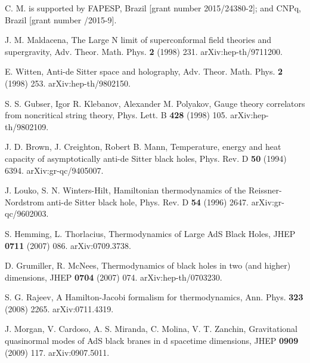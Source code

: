 \documentclass[prd,onecolumn,notitlepage,amsmath,nofootinbib,superscriptaddress,showpacs,showkeys]{revtex4-1}
\begin{document}



\begin{acknowledgments}

C. M. is supported by FAPESP, Brazil [grant number 2015/24380-2]; and CNPq,
Brazil [grant number /2015-9].

\end{acknowledgments}



\bigskip{}



\begin{thebibliography}{99}

J. M. Maldacena, The Large N limit of superconformal
field theories and supergravity, Adv. Theor. Math. Phys. \textbf{2}
(1998) 231. arXiv:hep-th/9711200.

E. Witten, Anti-de Sitter space and holography, Adv.
Theor. Math. Phys. \textbf{2} (1998) 253. arXiv:hep-th/9802150.

S. S. Gubser, Igor R. Klebanov, Alexander M. Polyakov,
Gauge theory correlators from noncritical string theory, Phys. Lett.
B \textbf{428} (1998) 105. arXiv:hep-th/9802109.

J. D. Brown, J. Creighton, Robert B. Mann, Temperature,
energy and heat capacity of asymptotically anti-de Sitter black holes,
Phys. Rev. D \textbf{50} (1994) 6394. arXiv:gr-qc/9405007.

J. Louko, S. N. Winters-Hilt, Hamiltonian thermodynamics
of the Reissner-Nordstrom anti-de Sitter black hole, Phys. Rev. D
\textbf{54} (1996) 2647. arXiv:gr-qc/9602003.

S. Hemming, L. Thorlacius, Thermodynamics of Large
AdS Black Holes, JHEP \textbf{0711} (2007) 086. arXiv:0709.3738.

D. Grumiller, R. McNees, Thermodynamics of black
holes in two (and higher) dimensions, JHEP \textbf{0704} (2007) 074.
arXiv:hep-th/0703230.

S. G. Rajeev, A Hamilton-Jacobi formalism for thermodynamics,
Ann. Phys. \textbf{323} (2008) 2265. arXiv:0711.4319.

J. Morgan, V. Cardoso, A. S. Miranda, C. Molina,
V. T. Zanchin, Gravitational quasinormal modes of AdS black branes
in d spacetime dimensions, JHEP \textbf{0909} (2009) 117. arXiv:0907.5011.


\end{thebibliography}
\end{document}
